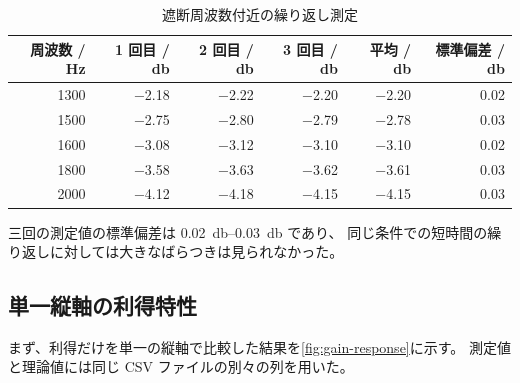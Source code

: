 \begin{table}[H]
  \centering
  \caption{遮断周波数付近の繰り返し測定}
  \label{tab:repeatability}
  \begin{tabular}{rrrrrr}
    \toprule
    周波数 / \unit{\hertz} & 1 回目 / \unit{\decibel} & 2 回目 / \unit{\decibel} & 3 回目 / \unit{\decibel} & 平均 / \unit{\decibel} & 標準偏差 / \unit{\decibel} \\
    \midrule
    \num{1300} & \num{-2.18} & \num{-2.22} & \num{-2.20} & \num{-2.20} & \num{0.02} \\
    \num{1500} & \num{-2.75} & \num{-2.80} & \num{-2.79} & \num{-2.78} & \num{0.03} \\
    \num{1600} & \num{-3.08} & \num{-3.12} & \num{-3.10} & \num{-3.10} & \num{0.02} \\
    \num{1800} & \num{-3.58} & \num{-3.63} & \num{-3.62} & \num{-3.61} & \num{0.03} \\
    \num{2000} & \num{-4.12} & \num{-4.18} & \num{-4.15} & \num{-4.15} & \num{0.03} \\
    \bottomrule
  \end{tabular}
\end{table}


三回の測定値の標準偏差は \qtyrange{0.02}{0.03}{\decibel} であり、
同じ条件での短時間の繰り返しに対しては大きなばらつきは見られなかった。

\subsection{単一縦軸の利得特性}
\label{subsec:single-axis-plot}

まず、利得だけを単一の縦軸で比較した結果を\cref{fig:gain-response}に示す。
測定値と理論値には同じ CSV ファイルの別々の列を用いた。

